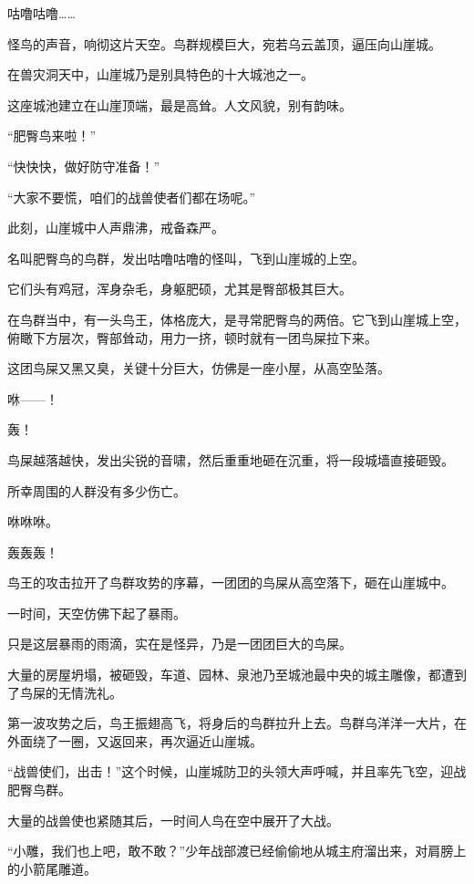 
\begin{this_body}

咕噜咕噜……

怪鸟的声音，响彻这片天空。鸟群规模巨大，宛若乌云盖顶，逼压向山崖城。

在兽灾洞天中，山崖城乃是别具特色的十大城池之一。

这座城池建立在山崖顶端，最是高耸。人文风貌，别有韵味。

“肥臀鸟来啦！”

“快快快，做好防守准备！”

“大家不要慌，咱们的战兽使者们都在场呢。”

此刻，山崖城中人声鼎沸，戒备森严。

名叫肥臀鸟的鸟群，发出咕噜咕噜的怪叫，飞到山崖城的上空。

它们头有鸡冠，浑身杂毛，身躯肥硕，尤其是臀部极其巨大。

在鸟群当中，有一头鸟王，体格庞大，是寻常肥臀鸟的两倍。它飞到山崖城上空，俯瞰下方层次，臀部耸动，用力一挤，顿时就有一团鸟屎拉下来。

这团鸟屎又黑又臭，关键十分巨大，仿佛是一座小屋，从高空坠落。

咻——！

轰！

鸟屎越落越快，发出尖锐的音啸，然后重重地砸在沉重，将一段城墙直接砸毁。

所幸周围的人群没有多少伤亡。

咻咻咻。

轰轰轰！

鸟王的攻击拉开了鸟群攻势的序幕，一团团的鸟屎从高空落下，砸在山崖城中。

一时间，天空仿佛下起了暴雨。

只是这层暴雨的雨滴，实在是怪异，乃是一团团巨大的鸟屎。

大量的房屋坍塌，被砸毁，车道、园林、泉池乃至城池最中央的城主雕像，都遭到了鸟屎的无情洗礼。

第一波攻势之后，鸟王振翅高飞，将身后的鸟群拉升上去。鸟群乌洋洋一大片，在外面绕了一圈，又返回来，再次逼近山崖城。

“战兽使们，出击！”这个时候，山崖城防卫的头领大声呼喊，并且率先飞空，迎战肥臀鸟群。

大量的战兽使也紧随其后，一时间人鸟在空中展开了大战。

“小雕，我们也上吧，敢不敢？”少年战部渡已经偷偷地从城主府溜出来，对肩膀上的小箭尾雕道。


\end{this_body}
